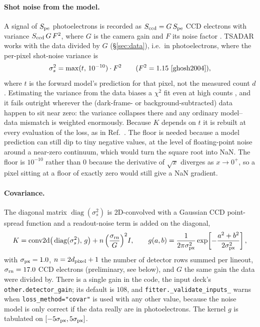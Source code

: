 \documentclass[11pt]{article}
\newcommand{\code}[1]{\texttt{#1}}
\begin{document}
\paragraph{Shot noise from the model.} A signal of $S_{\rm pe}$ photoelectrons is recorded
as $S_{\rm ccd}=G\,S_{\rm pe}$ CCD electrons with variance $S_{\rm ccd}\,G\,F^2$, where $G$
is the camera gain and $F$ its noise factor \cite{ghosh2004}. TSADAR works with the data
divided by $G$ (\S\ref{sec:data}), i.e.\ in photoelectrons, where the per-pixel shot-noise
variance is
\begin{equation}
  \sigma_s^2 = \max(t,\,10^{-10})\cdot F^2 \qquad(F^2=1.15\ \text{\cite{ghosh2004}}),
\end{equation}
where $t$ is the forward model's prediction for that pixel, not the measured count $d$.
Estimating the variance from the data biases a $\chi^2$ fit even at high counts
\cite{humphrey2009}, and it fails outright wherever the (dark-frame- or
background-subtracted) data happen to sit near zero: the variance collapses there and any
ordinary model--data mismatch is weighted enormously. Because $K$ depends on $t$ it is
rebuilt at every evaluation of the loss, as in Ref.~\cite{swadling2022}. The floor is
needed because a model prediction can still dip to tiny negative values, at the level of
floating-point noise around a near-zero continuum, which would turn the square root into
NaN. The floor is $10^{-10}$ rather than $0$ because the derivative of $\sqrt{x}$ diverges
as $x\to0^+$, so a pixel sitting at a floor of exactly zero would still give a NaN
gradient.

\paragraph{Covariance.} The diagonal matrix $\operatorname{diag}(\sigma_s^2)$ is
2D-convolved with a Gaussian CCD point-spread function and a readout-noise term is added
on the diagonal,
\begin{equation}
  K = \operatorname{conv2d}\!\big(\operatorname{diag}(\sigma_s^2),\,g\big)+n\,\Big(\frac{\sigma_{\rm rn}}{G}\Big)^{2} I,
  \qquad g(a,b)=\frac{1}{2\pi\sigma_{\rm px}^2}\exp\!\left[-\frac{a^2+b^2}{2\sigma_{\rm px}^2}\right],
\end{equation}
with $\sigma_{\rm px}=1.0$, $n=2d_{\rm pixel}+1$ the number of detector rows summed per
lineout, $\sigma_{\rm rn}=17.0$ CCD electrons (preliminary, see below), and $G$ the same
gain the data were divided by. There is a single gain in the code, the input deck's
\code{other.detector\_gain}; its default is $108$, and \code{fitter.\_validate\_inputs\_} warns when
\code{loss\_method="covar"} is used with any other value, because the noise model is only
correct if the data really are in photoelectrons. The kernel $g$ is tabulated on
$[-5\sigma_{\rm px},5\sigma_{\rm px}]$.
\end{document}
